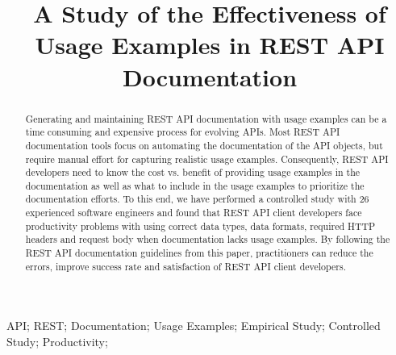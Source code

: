 \documentclass[conference]{IEEEtran}
\begin{document}
\title{A Study of the Effectiveness of Usage Examples in REST API Documentation}

\author{
\and
{}
\and
{}
}

\maketitle

\begin{abstract}
Generating and maintaining REST API documentation with usage examples can be a time consuming and expensive process for evolving APIs. Most REST API documentation tools focus on automating the documentation of the API objects, but require manual effort for capturing realistic usage examples. Consequently, REST API developers need to know the cost vs. benefit of providing usage examples in the documentation as well as what to include in the usage examples to prioritize the documentation efforts. To this end, we have performed a controlled study with 26 experienced software engineers and found that REST API client developers face productivity problems with using correct data types, data formats, required HTTP headers and request body when documentation lacks usage examples. By following the REST API documentation guidelines from this paper, practitioners can reduce the errors, improve success rate and satisfaction of REST API client developers.


\end{abstract}


\begin{IEEEkeywords}
API; REST; Documentation; Usage Examples; Empirical Study; Controlled Study; Productivity;

\end{IEEEkeywords}
\end{document}
